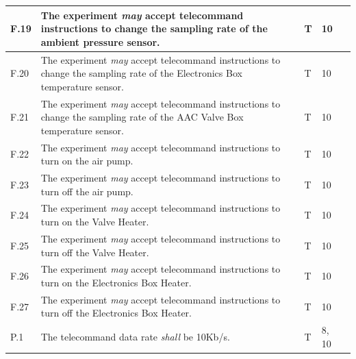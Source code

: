 \documentclass[a4paper,12pt,twoside]{article}
\begin{document}
\begin{longtable}[]{|m{}| m{} |m{} |m{}|m{}|}
F.19 & The experiment \textit{may} accept telecommand instructions to change the sampling rate of the ambient pressure sensor.                                                          &     T         & 10            &        \\ \hline
F.20 & The experiment \textit{may} accept telecommand instructions to change the sampling rate of the Electronics Box temperature sensor.                                                       &      T        & 10            &        \\ \hline
F.21 & The experiment \textit{may} accept telecommand instructions to change the sampling rate of the AAC Valve Box temperature sensor.                                                 &      T        & 10            &        \\ \hline
F.22 & The experiment \textit{may} accept telecommand instructions to turn on the air pump.                                                                                             &      T        & 10            &        \\ \hline
F.23 & The experiment \textit{may} accept telecommand instructions to turn off the air pump.                                                                                            &       T       & 10            &        \\ \hline
F.24 & The experiment \textit{may} accept telecommand instructions to turn on the Valve Heater.                                                                                         &      T        & 10            &        \\ \hline
F.25 & The experiment \textit{may} accept telecommand instructions to turn off the Valve Heater.                                                                                        &      T        & 10            &        \\ \hline
F.26 & The experiment \textit{may} accept telecommand instructions to turn on the Electronics Box Heater.                                                                                    &      T        & 10            &        \\ \hline
F.27 & The experiment \textit{may} accept telecommand instructions to turn off the Electronics Box Heater.                                                                                   &      T        & 10            &        \\ \hline
P.1  & The telecommand data rate \textit{shall} be 10Kb/s.                                                                                                                          &        T      & 8, 10            &        \\ \hline

\end{longtable}
\end{document}

